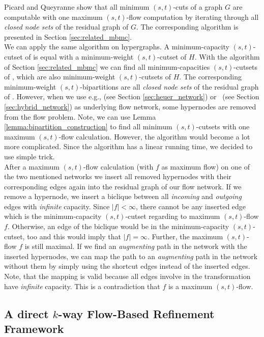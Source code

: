 Picard and Queyranne \cite{picard1980structure} show that all minimum $(s,t)$-cuts 
of a graph $G$ are computable with one maximum $(s,t)$-flow computation by 
iterating through all \emph{closed node sets} of the residual graph of $G$. 
The corresponding algorithm is presented in Section \ref{sec:related_mbmc}. \\
We can apply the same algorithm on hypergraphs. A minimum-capacity $(s,t)$-cutset of 
is equal with a minimum-weight $(s,t)$-cutset of $H$. With the algorithm
of Section \ref{sec:related_mbmc} we can find all minimum-capacities
$(s,t)$-cutsets of , which are also minimum-weight $(s,t)$-cutsets
of $H$. The corresponding minimum-weight $(s,t)$-bipartitions are all
\emph{closed node sets} of the residual graph of . 
However, when we use e.g.,  (see Section \ref{sec:heuer_network})
or \ShortHybrid~(see Section \ref{sec:hybrid_network}) as underlying flow network,
some hypernodes are removed from the flow problem. Note, we can use 
Lemma \ref{lemma:bipartition_construction} to find all minimum
$(s,t)$-cutsets with one maximum $(s,t)$-flow calculation. However, the algorithm would
become a lot more complicated. Since the algorithm has a linear running time, we decided
to use simple trick. \\
After a maximum $(s,t)$-flow calculation (with $f$ as maximum flow)
on one of the two mentioned networks we insert all removed hypernodes with
their corresponding edges again into the residual graph of our flow network.
If we remove a hypernode, we insert a biclique between all \emph{incoming}
and \emph{outgoing} edges with \emph{infinite} capacity. Since $|f| < \infty$,
there cannot be any inserted edge which is the minimum-capacity $(s,t)$-cutset
regarding to maximum $(s,t)$-flow $f$. Otherwise, an edge of the biclique
would be in the minimum-capacity $(s,t)$-cutset, too and this would imply that
$|f| = \infty$. Further, the maximum $(s,t)$-flow $f$ is still maximal. If we
find an \emph{augmenting} path in the network with the inserted hypernodes, we can
map the path to an \emph{augmenting} path in the network without them
by simply using the shortcut edges instead of the inserted edges. Note, that
the mapping is valid because all edges involve in the transformation have
\emph{infinite} capacity. This is a contradiction that $f$ is a maximum $(s,t)$-flow. 


\subsection{A direct $k$-way Flow-Based Refinement Framework}
\label{sec:flow_local_search_hypergraph}

